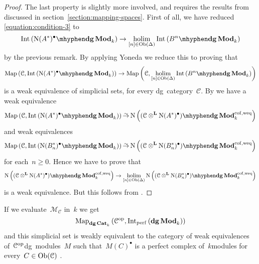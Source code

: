 \begin{refsection}
\begin{theorem}
\begin{proof}[Proof]
    The last property is slightly more involved, and requires the results from \cite{toen} discussed in section~\ref{section:mapping-spaces}. First of all, we have reduced \eqref{equation:condition-3} to
    \begin{equation}
      \Int\left( \dgMod{\nerve(A^*)^\bullet}_k \right)\to\holim_{[n]\in\Ob(\Delta)}\Int\left( \dgMod{B^n}_k \right)
    \end{equation}
    by the previous remark. By applying Yoneda we reduce this to proving that
    \begin{equation}
      \Map\left( \mathcal{C},\Int\left( \dgMod{\nerve(A^*)^\bullet}_k \right) \right)\to\Map\left( \mathcal{C},\holim_{[n]\in\Ob(\Delta)}\Int\left( \dgMod{B^n}_k \right) \right)
    \end{equation}
    is a weak equivalence of simplicial sets, for every dg~category~$\mathcal{C}$. By \cite[theorem 4.2]{toen} we have a weak equivalence
    \begin{equation}
      \Map\left( \mathcal{C},\Int\left( \dgMod{\nerve(A^*)^\bullet}_k \right) \right)\weq\nerve\left( \dgMod{(\mathcal{C}\otimes^{\mathbf{L}}\nerve(A^*)^\bullet)}_k^{\mathrm{cof,weq}} \right)
    \end{equation}
    and weak equivalences
    \begin{equation}
      \Map\left( \mathcal{C},\Int\left( \dgMod{\nerve(B_n^*)^\bullet}_k \right) \right)\weq\nerve\left( \dgMod{(\mathcal{C}\otimes^{\mathbf{L}}\nerve(B_n^*)^\bullet)}_k^{\mathrm{cof,weq}} \right)
    \end{equation}
    for each~$n\geq 0$. Hence we have to prove that
    \begin{equation}
      \nerve\left( \dgMod{(\mathcal{C}\otimes^{\mathbf{L}}\nerve(A^*)^\bullet)}_k^{\mathrm{cof,weq}} \right)\to\holim_{[n]\in\Ob(\Delta)}\nerve\left( \dgMod{(\mathcal{C}\otimes^{\mathbf{L}}\nerve(B_n^*)^\bullet)}_k^{\mathrm{cof,weq}} \right)
    \end{equation}
    is a weak equivalence. But this follows from \cite[corollary B.0.8]{hagII}.
  \end{proof}
\end{theorem}

\begin{example}
  If we evaluate~$\mathcal{M}_{\mathcal{C}}$ in~$k$ we get
  \begin{equation}
    \Map_{\dgCat_k}\left( \mathcal{C}^\opp,\Int_\perf\left( \dgMod_k \right) \right)
  \end{equation}
  and this simplicial set is weakly equivalent to the category of weak equivalences of~$\mathcal{C}^{\mathrm{op}}$\dash dg~modules~$M$ such that~$M(C)^\bullet$ is a perfect complex of~$k$\dash modules for every~$C\in\operatorname{Ob}(\mathcal{C})$ \cite[corollary 7.6]{toen}.
\end{example}



\end{refsection}
